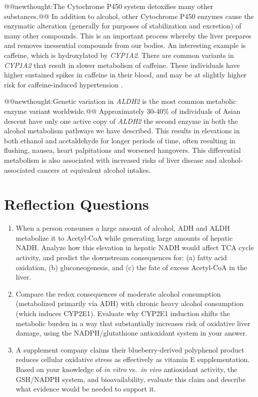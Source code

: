 \documentclass{tufte-handout}
\makeatletter
\def\newthought#1{@@newthought:#1@@}
\makeatother
\begin{document}
\newthought{The Cytochrome P450 system detoxifies many other substances.}  In addition to alcohol, other Cytochrome P450 enzymes cause the enzymatic alteration (generally for purposes of stabilization and excretion) of many other compounds.  This is an important process whereby the liver prepares and removes inessential compounds from our bodies.  An interesting example is caffeine, which is hydroxylated by \textit{CYP1A2}.  There are common variants in \textit{CYP1A2} that result in slower metabolism of caffeine.  These individuals have higher sustained spikes in caffeine in their blood, and may be at slightly higher risk for caffeine-induced hypertension \citep{palatiniCYP1A2GenotypeModifies2009}.

\newthought{Genetic variation in \textit{ALDH2} is the most common metabolic enzyme variant worldwide.}  Approximately 30-40\% of individuals of Asian descent have only one active copy of \textit{ALDH2} the second enzyme in both the alcohol metabolism pathways we have described.  This results in elevations in both ethanol and acetaldehyde for longer periods of time, often resulting in flushing, nausea, heart palpitations and worsened hangovers.  This differential metabolism is also associated with increased risks of liver disease and alcohol-associated cancers at equivalent alcohol intakes.

\section{Reflection Questions}
\begin{enumerate}
\item When a person consumes a large amount of alcohol, ADH and ALDH metabolize it to Acetyl-CoA while generating large amounts of hepatic NADH. Analyze how this elevation in hepatic NADH would affect TCA cycle activity, and predict the downstream consequences for: (a) fatty acid oxidation, (b) gluconeogenesis, and (c) the fate of excess Acetyl-CoA in the liver.
\item Compare the redox consequences of moderate alcohol consumption (metabolized primarily via ADH) with chronic heavy alcohol consumption (which induces CYP2E1). Evaluate why CYP2E1 induction shifts the metabolic burden in a way that substantially increases risk of oxidative liver damage, using the NADPH/glutathione antioxidant system in your answer.
\item A supplement company claims their blueberry-derived polyphenol product reduces cellular oxidative stress as effectively as vitamin E supplementation. Based on your knowledge of \textit{in vitro} vs.\ \textit{in vivo} antioxidant activity, the GSH/NADPH system, and bioavailability, evaluate this claim and describe what evidence would be needed to support it.
\end{enumerate}



\end{document}
